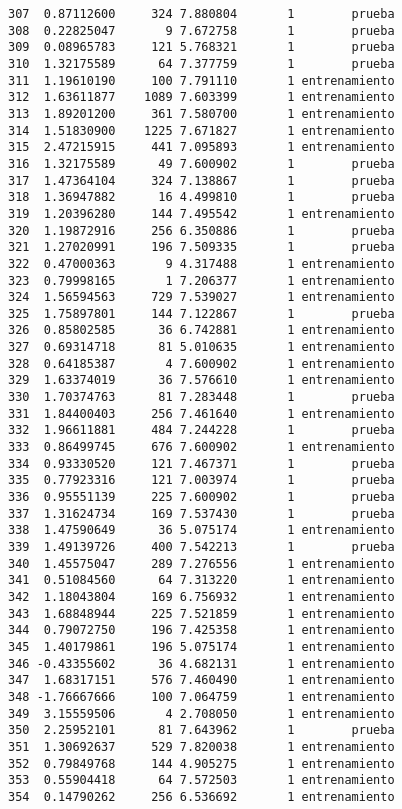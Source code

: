 \documentclass[
  letterpaper,
  DIV=11,
  numbers=noendperiod]{scrreprt}
\begin{document}
\begin{verbatim}
307  0.87112600     324 7.880804       1        prueba
308  0.22825047       9 7.672758       1        prueba
309  0.08965783     121 5.768321       1        prueba
310  1.32175589      64 7.377759       1        prueba
311  1.19610190     100 7.791110       1 entrenamiento
312  1.63611877    1089 7.603399       1 entrenamiento
313  1.89201200     361 7.580700       1 entrenamiento
314  1.51830900    1225 7.671827       1 entrenamiento
315  2.47215915     441 7.095893       1 entrenamiento
316  1.32175589      49 7.600902       1        prueba
317  1.47364104     324 7.138867       1        prueba
318  1.36947882      16 4.499810       1        prueba
319  1.20396280     144 7.495542       1 entrenamiento
320  1.19872916     256 6.350886       1        prueba
321  1.27020991     196 7.509335       1        prueba
322  0.47000363       9 4.317488       1 entrenamiento
323  0.79998165       1 7.206377       1 entrenamiento
324  1.56594563     729 7.539027       1 entrenamiento
325  1.75897801     144 7.122867       1        prueba
326  0.85802585      36 6.742881       1 entrenamiento
327  0.69314718      81 5.010635       1 entrenamiento
328  0.64185387       4 7.600902       1 entrenamiento
329  1.63374019      36 7.576610       1 entrenamiento
330  1.70374763      81 7.283448       1        prueba
331  1.84400403     256 7.461640       1 entrenamiento
332  1.96611881     484 7.244228       1        prueba
333  0.86499745     676 7.600902       1 entrenamiento
334  0.93330520     121 7.467371       1        prueba
335  0.77923316     121 7.003974       1        prueba
336  0.95551139     225 7.600902       1        prueba
337  1.31624734     169 7.537430       1        prueba
338  1.47590649      36 5.075174       1 entrenamiento
339  1.49139726     400 7.542213       1        prueba
340  1.45575047     289 7.276556       1 entrenamiento
341  0.51084560      64 7.313220       1 entrenamiento
342  1.18043804     169 6.756932       1 entrenamiento
343  1.68848944     225 7.521859       1 entrenamiento
344  0.79072750     196 7.425358       1 entrenamiento
345  1.40179861     196 5.075174       1 entrenamiento
346 -0.43355602      36 4.682131       1 entrenamiento
347  1.68317151     576 7.460490       1 entrenamiento
348 -1.76667666     100 7.064759       1 entrenamiento
349  3.15559506       4 2.708050       1 entrenamiento
350  2.25952101      81 7.643962       1        prueba
351  1.30692637     529 7.820038       1 entrenamiento
352  0.79849768     144 4.905275       1 entrenamiento
353  0.55904418      64 7.572503       1 entrenamiento
354  0.14790262     256 6.536692       1 entrenamiento

\end{verbatim}
\end{document}
